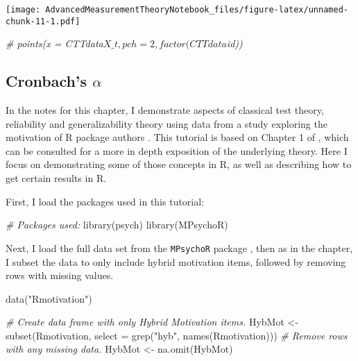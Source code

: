\documentclass[
]{book}
\newenvironment{Shaded}{\begin{snugshade}}{\end{snugshade}}
\newcommand{\AttributeTok}[1]{\textcolor[rgb]{0.77,0.63,0.00}{#1}}
\newcommand{\CommentTok}[1]{\textcolor[rgb]{0.56,0.35,0.01}{\textit{#1}}}
\newcommand{\FunctionTok}[1]{\textcolor[rgb]{0.00,0.00,0.00}{#1}}
\newcommand{\NormalTok}[1]{#1}
\newcommand{\OtherTok}[1]{\textcolor[rgb]{0.56,0.35,0.01}{#1}}
\newcommand{\StringTok}[1]{\textcolor[rgb]{0.31,0.60,0.02}{#1}}
\begin{document}
\texttt{[image: AdvancedMeasurementTheoryNotebook\_files/figure-latex/unnamed-chunk-11-1.pdf]}

\begin{Shaded}
\begin{Highlighting}[]
\CommentTok{\# points(x = CTTdata$X\_t, pch = 2, factor(CTTdata$id))}
\end{Highlighting}
\end{Shaded}

\hypertarget{cronbachs-alpha}{%
\subsection{\texorpdfstring{Cronbach's \(\alpha\)}{Cronbach's \textbackslash alpha}}\label{cronbachs-alpha}}

In the notes for this chapter, I demonstrate aspects of classical test theory, reliability and generalizability theory using data from a study exploring the motivation of R package authors \citep{mair2015motivation}.
This tutorial is based on Chapter 1 of \citet{mair2018modern}, which can be consulted for a more in depth exposition of the underlying theory.
Here I focus on demonstrating some of those concepts in R, as well as describing how to get certain results in R.

First, I load the packages used in this tutorial:

\begin{Shaded}
\begin{Highlighting}[]
\CommentTok{\# Packages used:}
\FunctionTok{library}\NormalTok{(psych)}
\FunctionTok{library}\NormalTok{(MPsychoR)}
\end{Highlighting}
\end{Shaded}

Next, I load the full data set from the \texttt{MPsychoR} package \citep{Mair2020mpsychor}, then as in the chapter, I subset the data to only include hybrid motivation items, followed by removing rows with missing values.

\begin{Shaded}
\begin{Highlighting}[]
\FunctionTok{data}\NormalTok{(}\StringTok{"Rmotivation"}\NormalTok{)}

\CommentTok{\# Create data frame with only Hybrid Motivation items.}
\NormalTok{HybMot }\OtherTok{\textless{}{-}} \FunctionTok{subset}\NormalTok{(Rmotivation, }
                        \AttributeTok{select =} \FunctionTok{grep}\NormalTok{(}\StringTok{"hyb"}\NormalTok{, }\FunctionTok{names}\NormalTok{(Rmotivation)))}
\CommentTok{\# Remove rows  with any missing data.}
\NormalTok{HybMot }\OtherTok{\textless{}{-}} \FunctionTok{na.omit}\NormalTok{(HybMot)}
\end{Highlighting}
\end{Shaded}
\end{document}
